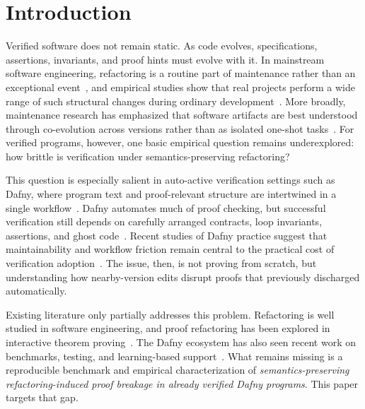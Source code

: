 \section{Introduction}

Verified software does not remain static. As code evolves, specifications, assertions, invariants, and proof hints must evolve with it. In mainstream software engineering, refactoring is a routine part of maintenance rather than an exceptional event~\cite{Mens2004RefactoringSurvey}, and empirical studies show that real projects perform a wide range of such structural changes during ordinary development~\cite{Kim2012RefactoringInTheWild,Tsantalis2014RefactoringOperations}. More broadly, maintenance research has emphasized that software artifacts are best understood through co-evolution across versions rather than as isolated one-shot tasks~\cite{Zaidman2010CoEvolutionProductionTest}. For verified programs, however, one basic empirical question remains underexplored: how brittle is verification under semantics-preserving refactoring?

This question is especially salient in auto-active verification settings such as Dafny, where program text and proof-relevant structure are intertwined in a single workflow~\cite{Leino2010Dafny}. Dafny automates much of proof checking, but successful verification still depends on carefully arranged contracts, loop invariants, assertions, and ghost code~\cite{Grov2016VerificationPatternsDafny}. Recent studies of Dafny practice suggest that maintainability and workflow friction remain central to the practical cost of verification adoption~\cite{Mugnier2025ImpactVerification}. The issue, then, is not proving from scratch, but understanding how nearby-version edits disrupt proofs that previously discharged automatically.

Existing literature only partially addresses this problem. Refactoring is well studied in software engineering, and proof refactoring has been explored in interactive theorem proving~\cite{Whiteside2011ProofScriptRefactoring,Whiteside2013RefactoringProofs,Adams2015Tactician}. The Dafny ecosystem has also seen recent work on benchmarks, testing, and learning-based support~\cite{DafnyBench2024,Wang2026TACoDafny,Xu2026DafnyComp}. What remains missing is a reproducible benchmark and empirical characterization of \emph{semantics-preserving refactoring-induced proof breakage in already verified Dafny programs}. This paper targets that gap.

